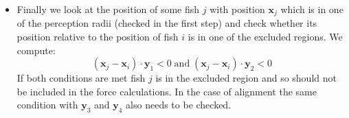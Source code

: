 \documentclass[11pt,a4paper]{article}
\begin{document}
\begin{itemize}
\item
  Finally we look at the position of some fish $j$ with position $\mathbf{x}_j$ which is in one of the perception radii (checked in the first step) and check whether its position relative to the position of fish $i$ is in one of the excluded regions. We compute:
  \begin{equation}
    \label{eq:condition}
    (\mathbf{x}_j-\mathbf{x}_i) \cdot \mathbf{y}_1 < 0 \; \text{and} \; (\mathbf{x}_j-\mathbf{x}_i) \cdot \mathbf{y}_2 < 0
  \end{equation}
  If both conditions are met fish $j$ is in the excluded region and so should not be included in the force calculations. In the case of alignment the same condition with $\mathbf{y}_3$ and $\mathbf{y}_4$ also needs to be checked.
\end{itemize}
\end{document}
